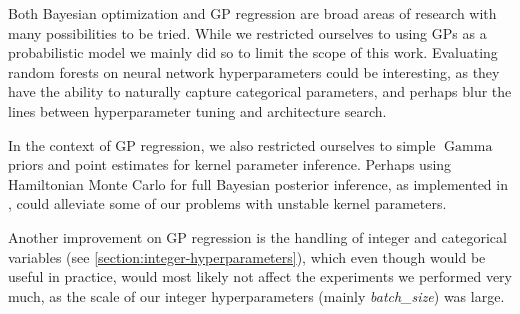 Both Bayesian optimization and GP regression are broad areas of research with many possibilities to be tried. While we restricted ourselves to using GPs as a probabilistic model we mainly did so to limit the scope of this work. Evaluating random forests on neural network hyperparameters could be interesting, as they have the ability to naturally capture categorical parameters, and perhaps blur the lines between hyperparameter tuning and architecture search.

In the context of GP regression, we also restricted ourselves to simple $\operatorname{Gamma}$ priors and point estimates for kernel parameter inference. Perhaps using Hamiltonian Monte Carlo for full Bayesian posterior inference, as implemented in \cite{gpy2014}, could alleviate some of our problems with unstable kernel parameters.

Another improvement on GP regression is the handling of integer and categorical variables (see \autoref{section:integer-hyperparameters}), which even though would be useful in practice, would most likely not affect the experiments we performed very much, as the scale of our integer hyperparameters (mainly \emph{batch\_size}) was large.


